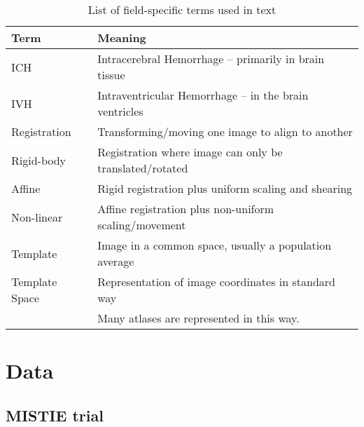 \documentclass[12pt]{report}
\begin{document}
\begin{refsection}
\begin{table}[htb]
\begin{tabular}{@{}m{}|p{}@{}}
Term & Meaning \\ \hline
ICH & Intracerebral Hemorrhage -- primarily in brain tissue \\
IVH & Intraventricular Hemorrhage -- in the brain ventricles \\
Registration & Transforming\slash moving one image to align to another \\
Rigid-body & Registration where image can only be translated\slash rotated \\
Affine & Rigid registration plus uniform scaling and shearing \\
Non-linear & Affine registration plus non-uniform scaling\slash movement\\
Template & Image in a common space, usually a population average \\
Template Space & Representation of image coordinates in standard way \\
& Many atlases are represented in this way.\\
\hline
\end{tabular}
\caption{List of field-specific terms used in text}
\label{tab:terms}
\end{table}

\chapter{Data}
\section{MISTIE trial}


\end{refsection}
\end{document}
